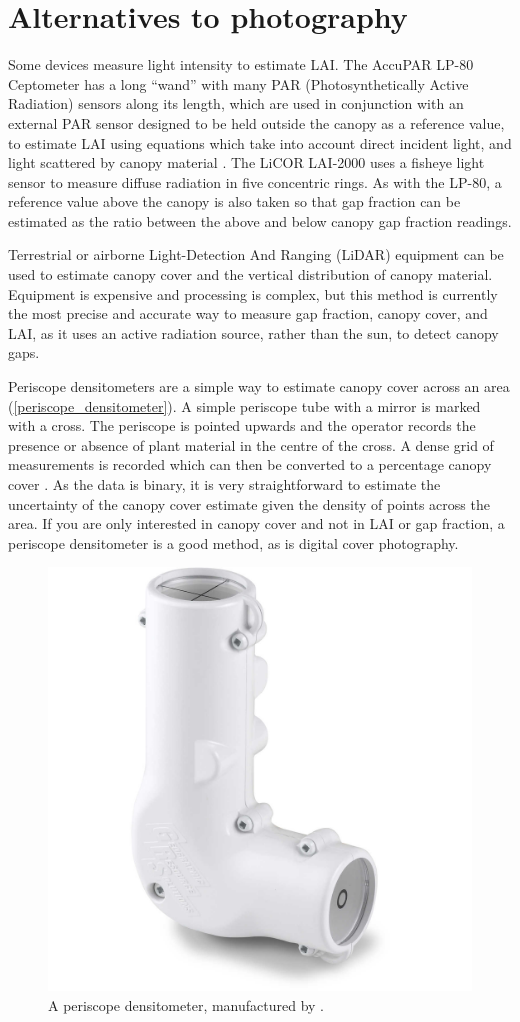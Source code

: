 \documentclass[11pt,a4paper]{article}
\begin{document}
\section{Alternatives to photography}

Some devices measure light intensity to estimate LAI. The AccuPAR LP-80 Ceptometer \citep{accupar2013} has a long ``wand'' with many PAR (Photosynthetically Active Radiation) sensors along its length, which are used in conjunction with an external PAR sensor designed to be held outside the canopy as a reference value, to estimate LAI using equations which take into account direct incident light, and light scattered by canopy material \citep{Goudriaan1988}. The LiCOR LAI-2000 \citep{lai2000, Cutini1998} uses a fisheye light sensor to measure diffuse radiation in five concentric rings. As with the LP-80, a reference value above the canopy is also taken so that gap fraction can be estimated as the ratio between the above and below canopy gap fraction readings. 

Terrestrial or airborne Light-Detection And Ranging (LiDAR) equipment can be used to estimate canopy cover and the vertical distribution of canopy material. Equipment is expensive and processing is complex, but this method is currently the most precise and accurate \citep{Seidel2011} way to measure gap fraction, canopy cover, and LAI, as it uses an active radiation source, rather than the sun, to detect canopy gaps. 

Periscope densitometers are a simple way to estimate canopy cover across an area (\autoref{periscope_densitometer}). A simple periscope tube with a mirror is marked with a cross. The periscope is pointed upwards and the operator records the presence or absence of plant material in the centre of the cross. A dense grid of measurements is recorded which can then be converted to a percentage canopy cover \citep{GRS}. As the data is binary, it is very straightforward to estimate the uncertainty of the canopy cover estimate given the density of points across the area. If you are only interested in canopy cover and not in LAI or gap fraction, a periscope densitometer is a good method, as is digital cover photography.

\begin{figure}[H]
	\includegraphics[width=0.5\linewidth]{periscope_densitometer}
	\caption{A periscope densitometer, manufactured by \citet{GRS}.}
	\label{periscope_densitometer}
\end{figure}
\end{document}
